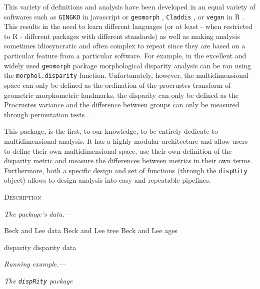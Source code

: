 \documentclass[12pt,letterpaper]{article}
\renewcommand{\section}[1]{%
\bigskip
\begin{center}
\begin{Large}
\normalfont\scshape #1
\medskip
\end{Large}
\end{center}}
\renewcommand{\subsection}[1]{%
\bigskip
\begin{center}
\begin{large}
\normalfont\itshape #1
\end{large}
\end{center}}
\renewcommand{\subsubsection}[1]{%
\vspace{2ex}
\noindent
\textit{#1.}---}
\begin{document}
This variety of definitions and analysis have been developed in an equal variety of softwares such as \texttt{GINGKO} in javascript \citep{bouxin2005ginkgo,de2007ginkgo} or \texttt{geomorph} \citep{adams2013geomorph,adams2017geometric}, \texttt{Claddis} \citep{Claddis}, or \texttt{vegan} \citep{oksanen2007vegan} in R \citep{R}.
This results in the need to learn different languages (or at least - when restricted to R - different packages with different standards) as well as making analysis sometimes idiosyncratic and often complex to repeat since they are based on a particular feature from a particular software.
For example, in the excellent and widely used \texttt{geomorph} package morphological disparity analysis can be ran using the \texttt{morphol.disparity} function.
Unfortunately, however, the multidimensional space can only be defined as the ordination of the procrustes transform of geometric morphometric landmarks, the disparity can only be defined as the Procrustes variance and the difference between groups can only be measured through permutation tests \citep{zelditch2012geometric,adams2013geomorph,adams2017geometric}.

This package, is the first, to our knowledge, to be entirely dedicate to multidimensional analysis.
It has a highly modular architecture and allow users to define their own multidimensional space, use their own definition of the disparity metric and measure the differences between metrics in their own terms.
Furthermore, both a specific design and set of functions (through the \texttt{dispRity} object) allows to design analysis into easy and repeatable pipelines.

\section{Description}

\subsubsection{The package's data}

Beck and Lee data
Beck and Lee tree
Beck and Lee ages

disparity  disparity data

\subsubsection{Running example}


\subsection{The \texttt{dispRity} package}
\end{document}
